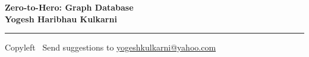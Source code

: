 
\graphicspath{{images/}}

\footnotesize


\begin{center}
\Large{\textbf{Zero-to-Hero: Graph Database\\ Yogesh Haribhau Kulkarni}}  
\end{center}

\begin{multicols}{2}

\end{multicols}

\rule{\linewidth}{0.25pt}
\scriptsize
Copyleft \textcopyleft\  Send suggestions to 
\href{http://www.yogeshkulkarni.com}{yogeshkulkarni@yahoo.com}


